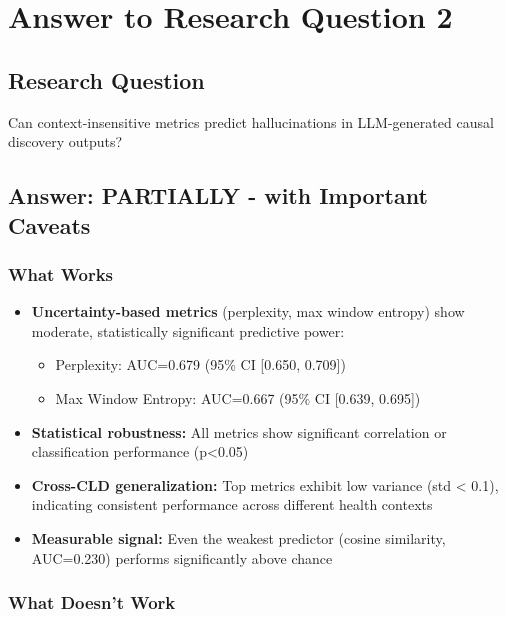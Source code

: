 \section{Answer to Research Question 2}

\subsection{Research Question}

Can context-insensitive metrics predict hallucinations in LLM-generated causal discovery outputs?

\subsection{Answer: PARTIALLY - with Important Caveats}

\subsubsection{What Works}

\begin{itemize}
    \item \textbf{Uncertainty-based metrics} (perplexity, max window entropy) show moderate, statistically significant predictive power:
    \begin{itemize}
        \item Perplexity: AUC=0.679 (95\% CI [0.650, 0.709])
        \item Max Window Entropy: AUC=0.667 (95\% CI [0.639, 0.695])
    \end{itemize}
    \item \textbf{Statistical robustness:} All metrics show significant correlation or classification performance (p<0.05)
    \item \textbf{Cross-CLD generalization:} Top metrics exhibit low variance (std < 0.1), indicating consistent performance across different health contexts
    \item \textbf{Measurable signal:} Even the weakest predictor (cosine similarity, AUC=0.230) performs significantly above chance
\end{itemize}

\subsubsection{What Doesn't Work}

